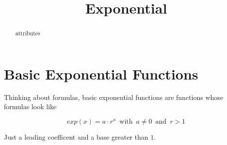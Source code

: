 \documentclass{ximera}
\title{Exponential}
\begin{document}
\begin{abstract}
attributes
\end{abstract}
\maketitle


\section*{Basic Exponential Functions}

Thinking about formulas, basic exponential functions are functions whose formulas look like

\[
exp(x) = a \cdot r^x \, \text{ with } \, a \ne 0 \, \text{ and } \, r > 1
\]

Just a leading coefficent and a base greater than $1$. \\
\end{document}
